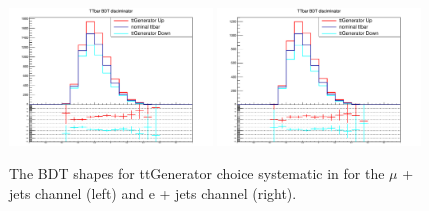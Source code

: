 


\begin{figure}[ht!]
    \includegraphics[width=0.48\textwidth]{images/Run2/Sys/ttGeneratorsystt.pdf}
    \includegraphics[width=0.48\textwidth]{images/Run2/Sys/ttGeneratorsystt_e.pdf}     
    \caption{The BDT shapes for ttGenerator choice systematic in \ttbar for the $\mu$ + jets channel (left) and e + jets channel (right).}
    \label{fig:SysShapesttGen}
\end{figure}

